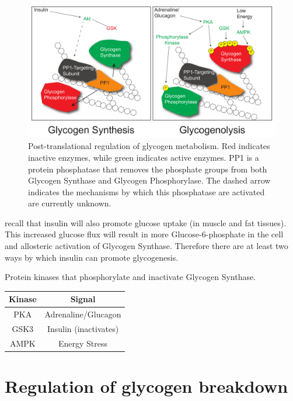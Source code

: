 \documentclass{tufte-handout}
\begin{document}
\begin{figure}
\includegraphics{figures/glycogen-phosphorylation}
\caption{Post-translational regulation of glycogen metabolism.  Red indicates inactive enzymes, while green indicates active enzymes. PP1 is a protein phosphatase that removes the phosphate groups from both Glycogen Synthase and Glycogen Phosphorylase.  The dashed arrow indicates the mechanisms by which this phosphatase are activated are currently unknown.}
\label{fig:glycogen-phosphorylation}
\end{figure}
\vspace{-4em}

 recall that insulin will also promote glucose uptake (in muscle and fat tissues).  This increased glucose flux will result in more Glucose-6-phosphate in the cell and allosteric activation of Glycogen Synthase.  Therefore there are at least two ways by which insulin can promote glycogenesis.

\begin{margintable}
\centering
\caption{Protein kinases that phosphorylate and inactivate Glycogen Synthase.}
\label{tab:gs-sites}
\begin{tabular}{cc}
\hline
\textbf {Kinase} & \textbf{Signal}  \\
\hline
PKA & Adrenaline/Glucagon \\
GSK3 & Insulin (inactivates) \\
AMPK & Energy Stress \\
\hline
\end{tabular}
\end{margintable}

\section{Regulation of glycogen breakdown}
\end{document}
